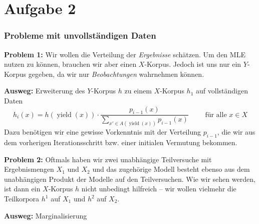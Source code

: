 \documentclass{beamer}
\begin{document}
\section{Aufgabe 2}

\begin{frame} \frametitle{Probleme mit unvollständigen Daten}
	\justifying \footnotesize 
	\textbf{Problem 1:} Wir wollen die Verteilung der \textit{Ergebnisse} schätzen. Um den MLE nutzen zu können, brauchen wir aber einen $X$-Korpus. Jedoch ist uns nur ein $Y$-Korpus gegeben, da wir nur \textit{Beobachtungen} wahrnehmen können. 
	
	\textbf{Ausweg:} Erweiterung des $Y$-Korpus $h$ zu einem $X$-Korpus $h_1$ auf vollständigen Daten
	\begin{equation*}
		h_i(x) = h(\operatorname{yield}(x)) \cdot \frac{p_{i-1}(x)}{\sum_{x' \in A(\operatorname{yield}(x))} p_{i-1}(x)} \qquad \text{ für alle } x \in X
	\end{equation*}
	Dazu benötigen wir eine gewisse Vorkenntnis mit der Verteilung $p_{i-1}$, die wir aus dem vorherigen Iterationsschritt bzw. einer initialen Vermutung bekommen.
	
	\textbf{Problem 2:} Oftmals haben wir zwei unabhängige Teilversuche mit Ergebnismengen $X_1$ und $X_2$ und das zugehörige Modell besteht ebenso aus dem unabhängigen Produkt der Modelle auf den Teilversuchen. Wie wir sehen werden, ist dann ein $X$-Korpus $h$ nicht unbedingt hilfreich -- wir wollen vielmehr die Teilkorpora $h^1$ auf $X_1$ und $h^2$ auf $X_2$. 
	
	\textbf{Ausweg:} Marginalisierung
\end{frame}
\end{document}

